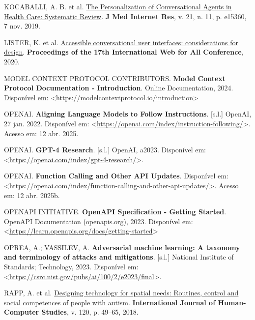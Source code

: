 \documentclass[
]{article}
\newlength{\cslhangindent}
\newenvironment{CSLReferences}[2] %
 {\begin{list}{}{%
  \setlength{\itemindent}{0pt}
  \setlength{\leftmargin}{0pt}
  \setlength{\parsep}{0pt}
  \ifodd #1
   \setlength{\leftmargin}{\cslhangindent}
   \setlength{\itemindent}{-1\cslhangindent}
  \fi
  \setlength{\itemsep}{#2\baselineskip}}}
 {\end{list}}
\begin{document}
\begin{CSLReferences}{0}{1}
KOCABALLI, A. B. et al. \href{https://doi.org/10.2196/15360}{The
Personalization of Conversational Agents in Health Care: Systematic
Review}. \textbf{J Med Internet Res}, v. 21, n. 11, p. e15360, 7 nov.
2019.

LISTER, K. et al.
\href{https://api.semanticscholar.org/CorpusID:218539971}{Accessible
conversational user interfaces: considerations for design}.
\textbf{Proceedings of the 17th International Web for All Conference},
2020.

MODEL CONTEXT PROTOCOL CONTRIBUTORS. \textbf{{Model Context Protocol
Documentation - Introduction}}. Online Documentation, 2024. Disponível
em:
\textless{}\url{https://modelcontextprotocol.io/introduction}\textgreater{}

OPENAI. \textbf{Aligning Language Models to Follow Instructions}.
{[}s.l.{]} OpenAI, 27 jan. 2022. Disponível em:
\textless{}\url{https://openai.com/index/instruction-following/}\textgreater.
Acesso em: 12 abr. 2025.

OPENAI. \textbf{GPT-4 Research}. {[}s.l.{]} OpenAI, a2023. Disponível
em:
\textless{}\url{https://openai.com/index/gpt-4-research/}\textgreater.

OPENAI. \textbf{Function Calling and Other API Updates}. Disponível em:
\textless{}\url{https://openai.com/index/function-calling-and-other-api-updates/}\textgreater.
Acesso em: 12 abr. 2025b.

OPENAPI INITIATIVE. \textbf{{OpenAPI Specification - Getting Started}}.
OpenAPI Documentation (openapis.org), 2023. Disponível em:
\textless{}\url{https://learn.openapis.org/docs/getting-started}\textgreater{}

OPREA, A.; VASSILEV, A. \textbf{Adversarial machine learning: A taxonomy
and terminology of attacks and mitigations}. {[}s.l.{]} National
Institute of Standards; Technology, 2023. Disponível em:
\textless{}\url{https://csrc.nist.gov/pubs/ai/100/2/e2023/final}\textgreater.

RAPP, A. et al.
\href{https://doi.org/10.1016/j.ijhcs.2018.07.005}{Designing technology
for spatial needs: Routines, control and social competences of people
with autism}. \textbf{International Journal of Human-Computer Studies},
v. 120, p. 49--65, 2018.

\end{CSLReferences}
\end{document}
